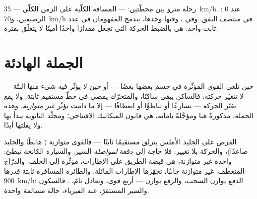 \begin{example}\label{ex:g9:uniform-varied-motion:sidebyside}
رحلة مترو بين محطّتين:  --- المسافة الكلّية
على الزمن الكلّي --- \qty{35}{km/h}. : $0$ عند
الرصيفين، و\qty{70}{km/h} في منتصف النفق. وفي ،
وفيها وحدها، يندمج المفهومان في عدد ثابت واحد:  هي بالضبط الحركة التي تجعل  مقدارًا واحدًا
أمينًا لا يتعلّق بفترة.
\end{example}

\section{الجملة الهادئة}

\begin{proposition}\label{prop:g9:uniform-varied-motion:inertia}
حين تلغي القوى المؤثّرة في جسم بعضها بعضًا --- أو حين لا يؤثّر
فيه شيء منها البتّة --- لا تتغيّر حركته: فالساكن يبقى ساكنًا،
والمتحرّك يمضي في خطّ مستقيم  ثابتة. ولا يقع تغيّر
الحركة --- تسارعًا أو تباطؤًا أو انعطافًا --- إلا ما دامت
تؤثّر  \emph{غير متوازنة}. وهذه الجملة، مذكورةً هنا
ومؤجَّلةً بأمانة، هي قانون الميكانيك الافتتاحي؛ ومجلّد
الثانوية يبدأ بها ولا يفلتها أبدًا.
\end{proposition}

\begin{example}\label{ex:g9:uniform-varied-motion:reading}
القرص على الجليد الأملس ينزلق مستقيمًا ثابتًا --- فالقوى
متوازنة ( هابطًا والجليد صاعدًا)، والحركة بلا تغيير: فلا
حاجة إلى دفعة \emph{لمواصلة} السير. والسيارة الكابحة تبطئ:
 واحدة غير متوازنة، هي قبضة الطريق على الإطارات، مؤثّرة
إلى الخلف. والدرّاج المنعطف:  غير متوازنة جانبًا، تجهّزها
الإطارات المائلة. والطائرة المسافرة  ثابتة قدرها
\qty{900}{km/h}: الدفع يوازن السحب، والرفع يوازن  ---
أربع قوى، وتعادل تامّ، . فالسكون والسير المستقرّ،
عند الفيزياء، حالة مسالمة واحدة.
\end{example}


